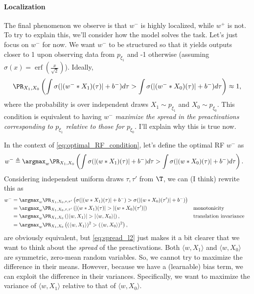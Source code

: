 \documentclass{article}
\begin{document}
\paragraph*{Localization}
The final phenomenon we observe is that $w^-$ is highly localized, while $w^+$ is not.
To try to explain this, we'll consider how the model solves the task.
Let's just focus on $w^-$ for now.
We want $w^-$ to be structured so that it yields outputs closer to 1 upon observing data from $p_{\xi_1}$ and -1 otherwise (assuming $\sigma(x) = \operatorname{erf}(\frac{x}{\sqrt{2}})$).
Ideally,
\begin{align}
  \PR_{X_1, X_0} \left( \int \sigma( |(w^- * X_1)(\tau)| + b^- ) d \tau > \int \sigma( |(w^- * X_0)(\tau)| + b^- ) d \tau \right) \approx 1, \label{eq:optimal_RF_condition}
\end{align}
where the probability is over independent draws $X_1 \sim p_{\xi_1}$ and $X_0 \sim p_{\xi_0}$.
This condition is equivalent to having $w^-$ \emph{maximize the spread in the preactivations corresponding to $p_{\xi_1}$ relative to those for $p_{\xi_0}$}.
I'll explain why this is true now.

In the context of \cref{eq:optimal_RF_condition}, let's define the optimal RF $w^-$ as
\begin{align*}
  w^- &\triangleq \argmax_{w}  \PR_{X_1, X_0} \left( \int \sigma( |(w * X_1)(\tau)| + b^- ) d \tau > \int \sigma( |(w * X_0)(\tau)| + b^- ) d \tau \right).
\end{align*}
Considering independent uniform draws $\tau,\tau'$ from $\T$, we can (I think) rewrite this as
\begin{align}
  w^-
  &= \argmax_{w} \PR_{X_1, X_0, \tau, \tau'} \left( \sigma( |(w * X_1)(\tau)| + b^- ) > \sigma( |(w * X_0)(\tau')| + b^- ) \right) \label{eq:split_integral} \\
  &= \argmax_{w} \PR_{X_1, X_0, \tau, \tau'} \left( |(w * X_1)(\tau)| >  |(w * X_0)(\tau')| \right) && \text{monotonicity} \label{eq:single_term} \\
  &= \argmax_{w} \PR_{X_1, X_0} \left( |\langle w, X_1 \rangle| > |\langle w, X_0 \rangle| \right), && \text{translation invariance} \label{eq:spread_l1} \\
  &= \argmax_{w} \PR_{X_1, X_0} \left( (\langle w, X_1 \rangle)^2 > (\langle w, X_0 \rangle)^2 \right), \label{eq:spread_l2} 
\end{align}
 are obviously equivalent, but \cref{eq:spread_l2} just makes it a bit clearer that we want to think about the \emph{spread} of the preactivations.
Both $\langle w, X_1 \rangle$ and $\langle w, X_0 \rangle$ are symmetric, zero-mean random variables.
So, we cannot try to maximize the difference in their means.
However, because we have a (learnable) bias term, we can exploit the difference in their variances.
Specifically, we want to maximize the variance of $\langle w, X_1 \rangle$ relative to that of $\langle w, X_0 \rangle$.
\end{document}
